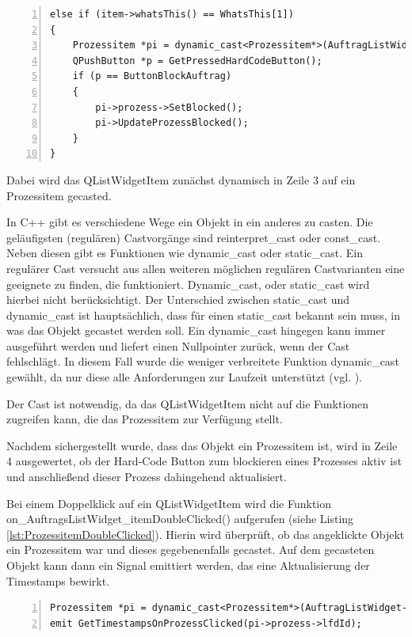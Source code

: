 \begin{lstlisting}[frame=single, breaklines=true, numbers=left, stepnumber=2, firstnumber=1, numberstyle = \tiny, caption=Funktionsblock nach Klicken auf Prozessitem ,label=lst:ProzessitemClicked]
else if (item->whatsThis() == WhatsThis[1])
{
    Prozessitem *pi = dynamic_cast<Prozessitem*>(AuftragListWidget->itemWidget(item));
    QPushButton *p = GetPressedHardCodeButton();
    if (p == ButtonBlockAuftrag)
    {
        pi->prozess->SetBlocked();
        pi->UpdateProzessBlocked();
    }
}
\end{lstlisting}

Dabei wird das QListWidgetItem zunächst dynamisch in Zeile 3 auf ein Prozessitem gecasted. 

In C++ gibt es verschiedene Wege ein Objekt in ein anderes zu casten. Die geläufigsten (regulären) Castvorgänge sind reinterpret\_cast oder const\_cast. Neben diesen gibt es Funktionen wie dynamic\_cast oder static\_cast. Ein regulärer Cast versucht aus allen weiteren möglichen regulären Castvarianten eine geeignete zu finden, die funktioniert. Dynamic\_cast, oder static\_cast wird hierbei nicht berücksichtigt. Der Unterschied zwischen static\_cast und dynamic\_cast ist hauptsächlich, dass für einen static\_cast bekannt sein muss, in was das Objekt gecastet werden soll. Ein dynamic\_cast hingegen kann immer ausgeführt werden und liefert einen Nullpointer zurück, wenn der Cast fehlschlägt. In diesem Fall wurde die weniger verbreitete Funktion dynamic\_cast gewählt, da nur diese alle Anforderungen zur Laufzeit unterstützt (vgl. \cite{cast}). 

Der Cast ist notwendig, da das QListWidgetItem nicht auf die Funktionen zugreifen kann, die das Prozessitem zur Verfügung stellt. 

Nachdem sichergestellt wurde, dass das Objekt ein Prozessitem ist, wird in Zeile 4 ausgewertet, ob der Hard-Code Button zum blockieren eines Prozesses aktiv ist und anschließend dieser Prozess dahingehend aktualisiert.

Bei einem Doppelklick auf ein QListWidgetItem wird die Funktion on\_Auf\-trags\-List\-Widget\_item\-Double\-Clicked() aufgerufen (siehe Listing \ref{lst:ProzessitemDoubleClicked}). Hierin wird überprüft, ob das angeklickte Objekt ein Prozessitem war und dieses gegebenenfalls gecastet. Auf dem gecasteten Objekt kann dann ein Signal emittiert werden, das eine Aktualisierung der Timestamps bewirkt. 

\begin{lstlisting}[frame=single, breaklines=true, numbers=left, stepnumber=2, firstnumber=1, numberstyle = \tiny, caption=Funktionsblock nach Doppelklick auf Prozessitem ,label=lst:ProzessitemDoubleClicked]
Prozessitem *pi = dynamic_cast<Prozessitem*>(AuftragListWidget->itemWidget(item));
emit GetTimestampsOnProzessClicked(pi->prozess->lfdId);
\end{lstlisting}

